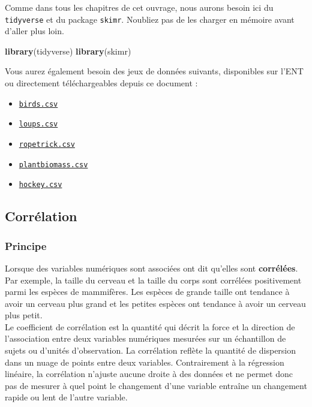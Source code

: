 \documentclass[
  a4paper,
]{article}
\newenvironment{Shaded}{\begin{snugshade}}{\end{snugshade}}
\newcommand{\KeywordTok}[1]{\textcolor[rgb]{0.12,0.11,0.11}{\textbf{#1}}}
\newcommand{\NormalTok}[1]{\textcolor[rgb]{0.12,0.11,0.11}{#1}}
\providecommand{\tightlist}{%
  \setlength{\itemsep}{0pt}\setlength{\parskip}{0pt}}
\begin{document}
Comme dans tous les chapitres de cet ouvrage, nous aurons besoin ici du \texttt{tidyverse} et du package \texttt{skimr}. Noubliez pas de les charger en mémoire avant d'aller plus loin.

\begin{Shaded}
\begin{Highlighting}[]
\KeywordTok{library}\NormalTok{(tidyverse)}
\KeywordTok{library}\NormalTok{(skimr)}
\end{Highlighting}
\end{Shaded}

Vous aurez également besoin des jeux de données suivants, disponibles sur l'ENT ou directement téléchargeables depuis ce document :

\begin{itemize}
\tightlist
\item
  \href{https://besibo.github.io/Biometrie3/data/birds.csv}{\texttt{birds.csv}}
\item
  \href{https://besibo.github.io/Biometrie3/data/loups.csv}{\texttt{loups.csv}}
\item
  \href{https://besibo.github.io/Biometrie3/data/ropetrick.csv}{\texttt{ropetrick.csv}}
\item
  \href{https://besibo.github.io/Biometrie3/data/plantbiomass.csv}{\texttt{plantbiomass.csv}}
\item
  \href{https://besibo.github.io/Biometrie3/data/hockey.csv}{\texttt{hockey.csv}}
\end{itemize}

\hypertarget{corruxe9lation}{%
\subsection{Corrélation}\label{corruxe9lation}}

\hypertarget{principe-1}{%
\subsubsection{Principe}\label{principe-1}}

Lorsque des variables numériques sont associées ont dit qu'elles sont \textbf{corrélées}. Par exemple, la taille du cerveau et la taille du corps sont corrélées positivement parmi les espèces de mammifères. Les espèces de grande taille ont tendance à avoir un cerveau plus grand et les petites espèces ont tendance à avoir un cerveau plus petit.\\
Le coefficient de corrélation est la quantité qui décrit la force et la direction de l'association entre deux variables numériques mesurées sur un échantillon de sujets ou d'unités d'observation. La corrélation reflète la quantité de dispersion dans un nuage de points entre deux variables. Contrairement à la régression linéaire, la corrélation n'ajuste aucune droite à des données et ne permet donc pas de mesurer à quel point le changement d'une variable entraîne un changement rapide ou lent de l'autre variable.
\end{document}
